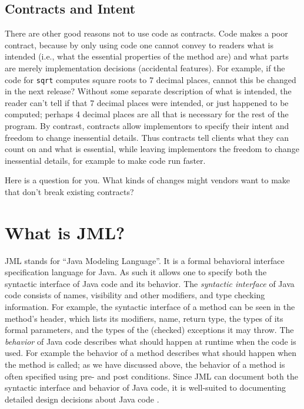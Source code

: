 \documentclass[twocolumn]{article}
\begin{document}
\subsection{Contracts and Intent}

There are other good reasons not to use code as contracts. Code makes a poor
contract, because by only using code one cannot convey to readers
what is intended (i.e., what the essential properties of the method
are) and what parts are merely implementation decisions (accidental
features).  For example, if the code for \texttt{sqrt} computes square
roots to 7 decimal places, cannot this be changed in the next release?
Without some separate description of what is intended,
the reader can't tell if that 7 decimal places were intended, or just
happened to be computed; perhaps 4 decimal places are all that is
necessary for the rest of the program.
By contrast, contracts allow implementors to specify their
intent and freedom to change inessential details. Thus contracts tell
clients what they can count on and what is essential, while leaving
implementors the freedom to change inessential details, for example
to make code run faster.

Here is a question for you. What kinds of changes might vendors want
to make that don't break existing contracts?

\section{What is JML?}

JML stands for ``Java Modeling Language''.  It is a formal behavioral
interface specification language for Java.
As such it allows one to specify both the syntactic interface of
Java code and its behavior.  The \emph{syntactic interface\/} of Java code
consists of names, visibility and other modifiers,
and type checking information.
For example, the syntactic interface of a method can be seen in the
method's header, which lists its modifiers, name, return
type, the types of its formal parameters, and the types of the
(checked) exceptions it may throw.
The \emph{behavior\/} of Java code describes what should happen at
runtime when the code is used.  For example the behavior of a method
describes what should happen when the method is called;
as we have discussed above, the behavior of a method is often
specified using pre- and post conditions.
Since JML can document both the syntactic interface and behavior of
Java code, it is well-suited to documenting detailed design decisions
about Java code \cite{Leavens-Baker-Ruby06}.
\end{document}
